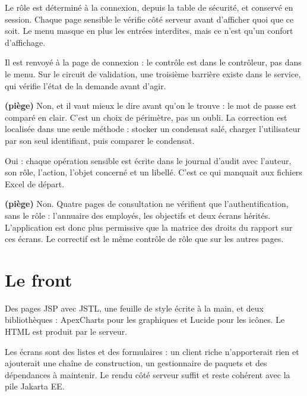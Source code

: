\documentclass[a4paper,11pt]{article}
\begin{document}
Le rôle est déterminé à la connexion, depuis la table de sécurité, et conservé
en session. Chaque page sensible le vérifie côté serveur avant d'afficher quoi
que ce soit. Le menu masque en plus les entrées interdites, mais ce n'est qu'un
confort d'affichage.

Il est renvoyé à la page de connexion : le contrôle est dans le contrôleur, pas
dans le menu. Sur le circuit de validation, une troisième barrière existe dans
le service, qui vérifie l'état de la demande avant d'agir.

 \textbf{(piège)}
Non, et il vaut mieux le dire avant qu'on le trouve : le mot de passe est
comparé en clair. C'est un choix de périmètre, pas un oubli. La correction est
localisée dans une seule méthode : stocker un condensat salé, charger
l'utilisateur par son seul identifiant, puis comparer le condensat.

Oui : chaque opération sensible est écrite dans le journal d'audit avec l'auteur,
son rôle, l'action, l'objet concerné et un libellé. C'est ce qui manquait aux
fichiers Excel de départ.

 \textbf{(piège)}
Non. Quatre pages de consultation ne vérifient que l'authentification, sans le
rôle : l'annuaire des employés, les objectifs et deux écrans hérités.
L'application est donc plus permissive que la matrice des droits du rapport sur
ces écrans. Le correctif est le même contrôle de rôle que sur les autres pages.

\section{Le front}

Des pages JSP avec JSTL, une feuille de style écrite à la main, et deux
bibliothèques : ApexCharts pour les graphiques et Lucide pour les icônes. Le
HTML est produit par le serveur.

Les écrans sont des listes et des formulaires : un client riche n'apporterait
rien et ajouterait une chaîne de construction, un gestionnaire de paquets et des
dépendances à maintenir. Le rendu côté serveur suffit et reste cohérent avec la
pile Jakarta EE.
\end{document}
